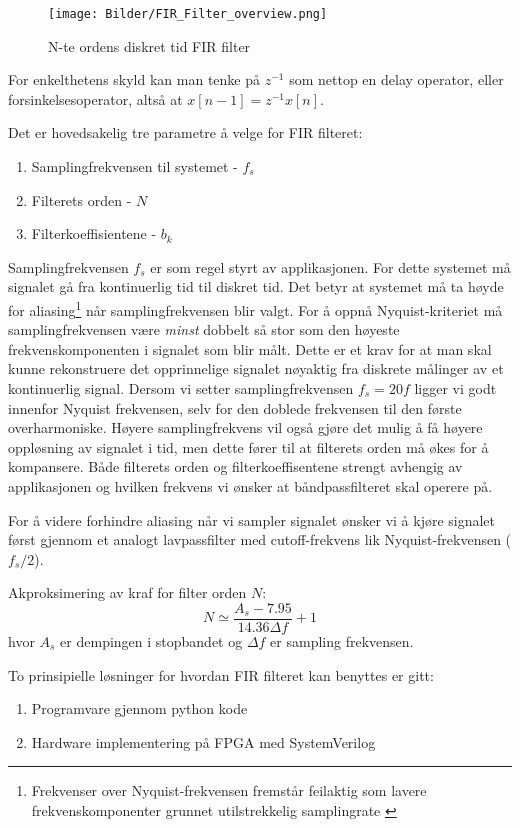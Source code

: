 \begin{figure}[H]
    \centering
    \texttt{[image: Bilder/FIR\_Filter\_overview.png]}
    \caption{N-te ordens diskret tid FIR filter \cite{fir_wiki}}
    \label{fig:fir_filter_overview}
\end{figure}

For enkelthetens skyld kan man tenke på $z^{-1}$ som nettop en delay operator, eller forsinkelsesoperator, 
altså at $x[n-1] = z^{-1}x[n]$.

\newpage
Det er hovedsakelig tre parametre å velge for FIR filteret:
\begin{enumerate}
    \item Samplingfrekvensen til systemet - $f_s$
    \item Filterets orden - $N$
    \item Filterkoeffisientene - $b_k$
\end{enumerate}

Samplingfrekvensen $f_s$ er som regel styrt av applikasjonen. For dette systemet må signalet gå fra 
kontinuerlig tid til diskret tid. Det betyr at systemet må ta høyde for aliasing\footnote{Frekvenser over Nyquist-frekvensen fremstår feilaktig som lavere frekvenskomponenter grunnet utilstrekkelig samplingrate \cite{aliasing}} 
når samplingfrekvensen blir valgt.
For å oppnå Nyquist-kriteriet \cite{nyquist} må samplingfrekvensen være \textit{minst} dobbelt så stor som den høyeste
frekvenskomponenten i signalet som blir målt. Dette er et krav for at man skal kunne rekonstruere det opprinnelige signalet 
nøyaktig fra diskrete målinger av et kontinuerlig signal. Dersom vi setter samplingfrekvensen $f_s = 20f$ ligger vi godt innenfor 
Nyquist frekvensen, selv for den doblede frekvensen til den første overharmoniske. Høyere samplingfrekvens vil også gjøre det mulig 
å få høyere oppløsning av signalet i tid, men dette fører til at filterets orden må økes for å kompansere.
Både filterets orden og filterkoeffisentene strengt avhengig av applikasjonen og hvilken frekvens vi ønsker 
at båndpassfilteret skal operere på.

For å videre forhindre aliasing når vi sampler signalet ønsker vi å kjøre signalet først gjennom et analogt 
lavpassfilter med cutoff-frekvens lik Nyquist-frekvensen ($f_s/2$).

Akproksimering av kraf for filter orden $N$:
\[
    N \simeq \frac{A_s - 7.95}{14.36 \Delta f} + 1
\]
hvor $A_s$ er dempingen i stopbandet og $\Delta f$ er sampling frekvensen.

To prinsipielle løsninger for hvordan FIR filteret kan benyttes er gitt:
\begin{enumerate}
    \item Programvare gjennom python kode
    \item Hardware implementering på FPGA med SystemVerilog
\end{enumerate}

